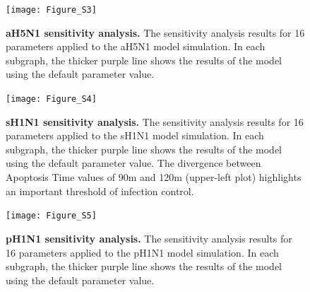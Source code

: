 \documentclass[10pt]{article}
\newcommand{\drew}[1]{{\color{dkgreen}#1}}
\begin{document}
\pagebreak
\begin{landscape}

\begin{figure}[ht!]
\begin{center}
	\texttt{[image: Figure\_S3]}
	\caption{\textbf{aH5N1 sensitivity analysis.} The sensitivity analysis results for 16 parameters applied to the aH5N1 model simulation.  In each subgraph, the thicker purple line shows the results of the model using the default parameter value.}
	\label{fig:asensitivity}
\end{center}
\end{figure}

\begin{figure}[ht!]
\begin{center}
	\texttt{[image: Figure\_S4]}
	\caption{\textbf{sH1N1 sensitivity analysis.} The sensitivity analysis results for 16 parameters applied to the sH1N1 model simulation.  In each subgraph, the thicker purple line shows the results of the model using the default parameter value.  The divergence between Apoptosis Time values of 90m and 120m (upper-left plot) highlights an important threshold of infection control.}
	\label{fig:ssensitivity}
\end{center}
\end{figure}

\begin{figure}[ht!]
\begin{center}
	\texttt{[image: Figure\_S5]}
	\caption{\textbf{pH1N1 sensitivity analysis.} The sensitivity analysis results for 16 parameters applied to the pH1N1 model simulation.  In each subgraph, the thicker purple line shows the results of the model using the default parameter value.}
	\label{fig:psensitivity}
\end{center}
\end{figure}

\end{landscape}



\end{document}
